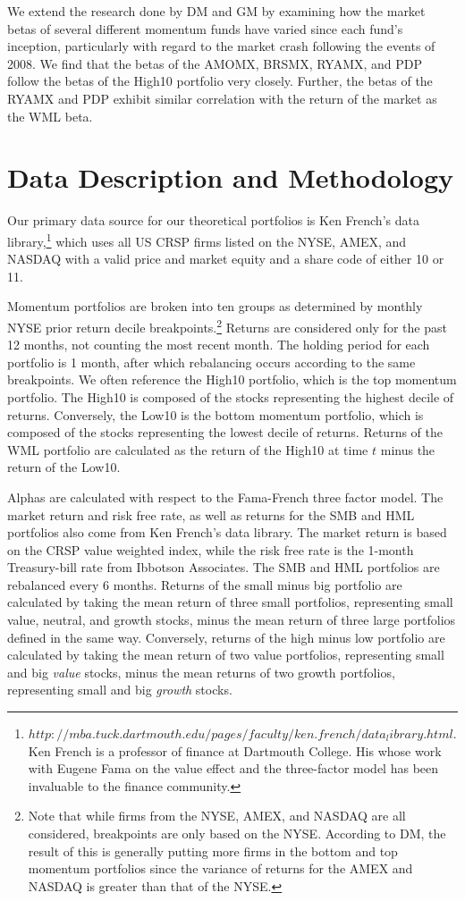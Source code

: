 \documentclass[12pt]{article}
\begin{document}
We extend the research done by DM and GM by examining how the market betas of several different momentum funds have varied since each fund's inception, particularly with regard to the market crash following the events of 2008. We find that the betas of the AMOMX, BRSMX, RYAMX, and PDP follow the betas of the High10 portfolio very closely. Further, the betas of the RYAMX and PDP exhibit similar correlation with the return of the market as the WML beta.

\section{Data Description and Methodology} %

Our primary data source for our theoretical portfolios is Ken French's data library,\footnote{$http://mba.tuck.dartmouth.edu/pages/faculty/ken.french/data_library.html$. Ken French is a professor of finance at Dartmouth College. His whose work with Eugene Fama on the value effect and the three-factor model has been invaluable to the finance community.} which uses all US CRSP firms listed on the NYSE, AMEX, and NASDAQ with a valid price and market equity and a share code of either 10 or 11. 

Momentum portfolios are broken into ten groups as determined by monthly NYSE prior return decile breakpoints.\footnote{Note that while firms from the NYSE, AMEX, and NASDAQ are all considered, breakpoints are only based on the NYSE. According to DM, the result of this is generally putting more firms in the bottom and top momentum portfolios since the variance of returns for the AMEX and NASDAQ is greater than that of the NYSE.} Returns are considered only for the past 12 months, not counting the most recent month. The holding period for each portfolio is 1 month, after which rebalancing occurs according to the same breakpoints. We often reference the High10 portfolio, which is the top momentum portfolio. The High10 is composed of the stocks representing the highest decile of returns. Conversely, the Low10 is the bottom momentum portfolio, which is composed of the stocks representing the lowest decile of returns. Returns of the WML portfolio are calculated as the return of the High10 at time $t$ minus the return of the Low10.

Alphas are calculated with respect to the Fama-French three factor model. The market return and risk free rate, as well as returns for the SMB and HML portfolios also come from Ken French's data library. The market return is based on the CRSP value weighted index, while the risk free rate is the 1-month Treasury-bill rate from Ibbotson Associates. The SMB and HML portfolios are rebalanced every 6 months. Returns of the small minus big portfolio are calculated by taking the mean return of three small portfolios, representing small value, neutral, and growth stocks, minus the mean return of three large portfolios defined in the same way. Conversely, returns of the high minus low portfolio are calculated by taking the mean return of two value portfolios, representing small and big \emph{value} stocks, minus the mean returns of two growth portfolios, representing small and big \emph{growth} stocks.
\end{document}
